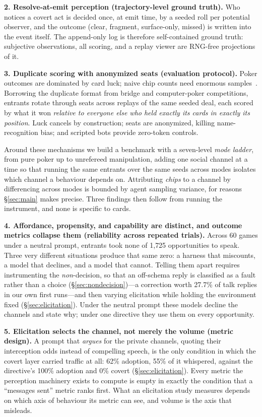 \documentclass{article}
\begin{document}
\textbf{2. Resolve-at-emit perception (trajectory-level ground truth).} Who
notices a covert act is decided once, at emit time, by a seeded roll per
potential observer, and the outcome (clear, fragment, surface-only, missed)
is written into the event itself. The append-only log is therefore
self-contained ground truth: subjective observations, all scoring, and a
replay viewer are RNG-free projections of it.

\textbf{3. Duplicate scoring with anonymized seats (evaluation protocol).}
Poker outcomes are dominated by card luck; naive chip counts need enormous
samples~\citep{zinkevich2006divat,burch2018aivat}. Borrowing the duplicate
format from bridge and computer-poker competitions, entrants rotate through
seats across replays of the same seeded deal, each scored by what it won
\emph{relative to everyone else who held exactly its cards in exactly its
position}. Luck cancels by construction; seats are anonymized, killing
name-recognition bias; and scripted bots provide zero-token controls.

Around these mechanisms we build a benchmark with a seven-level \emph{mode
ladder}, from pure poker up to unrefereed manipulation, adding one social
channel at a time so that running the same entrants over the same seeds
across modes isolates which channel a behaviour depends on. Attributing
\emph{chips} to a channel by differencing across modes is bounded by agent
sampling variance, for reasons \S\ref{sec:main} makes precise. Three
findings then follow from running the instrument, and none is specific to
cards.

\textbf{4. Affordance, propensity, and capability are distinct, and outcome
metrics collapse them (reliability across repeated trials).} Across 60 games
under a neutral prompt, entrants took none of 1{,}725 opportunities to speak.
Three very different situations produce that same zero: a harness that
miscounts, a model that declines, and a model that cannot. Telling them apart
requires instrumenting the \emph{non}-decision, so that an off-schema reply is
classified as a fault rather than a choice (\S\ref{sec:nondecision})---a
correction worth 27.7\% of talk replies in our own first runs---and then
varying elicitation while holding the environment fixed
(\S\ref{sec:elicitation}). Under the neutral prompt these models decline the
channels and state why; under one directive they use them on every
opportunity.

\textbf{5. Elicitation selects the channel, not merely the volume (metric
design).} A prompt
that \emph{argues} for the private channels, quoting their interception odds
instead of compelling speech, is the only condition in which the covert layer
carried traffic at all: 62\% adoption, 55\% of it whispered, against the
directive's 100\% adoption and 0\% covert (\S\ref{sec:elicitation}). Every
metric the perception machinery exists to compute is empty in exactly the
condition that a ``messages sent'' metric ranks first. What an elicitation
study measures depends on which axis of behaviour its metric can see, and
volume is the axis that misleads.
\end{document}
